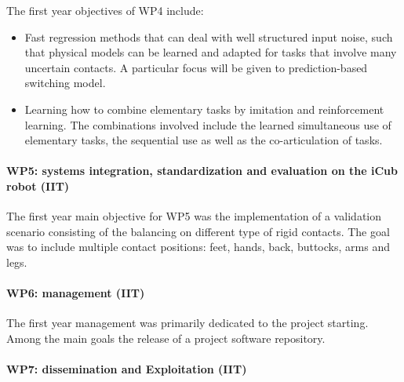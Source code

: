 \documentclass[12pt,a4paper,twoside]{article}
\begin{document}
The first year objectives of WP4 include:
\begin{itemize}
 \item Fast regression methods that can deal with well structured input noise, such that physical models can
be learned and adapted for tasks that involve many uncertain contacts. A particular focus will be given to
prediction-based switching model.
\item Learning how to combine elementary tasks by imitation and reinforcement learning. The combinations involved
include the learned simultaneous use of elementary tasks, the sequential use as well as the co-articulation of
tasks.
\end{itemize}


\paragraph{WP5: systems integration, standardization and evaluation on the iCub robot (IIT)}

The first year main objective for WP5 was the implementation of a validation scenario consisting of the balancing on different type of rigid contacts. The goal was to include multiple contact positions: feet, hands, back, buttocks, arms and legs. 


\paragraph{WP6: management (IIT)}

The first year management was primarily dedicated to the project starting. Among the main goals the release of a project software repository.


\paragraph{WP7: dissemination and Exploitation (IIT)}
\end{document}
